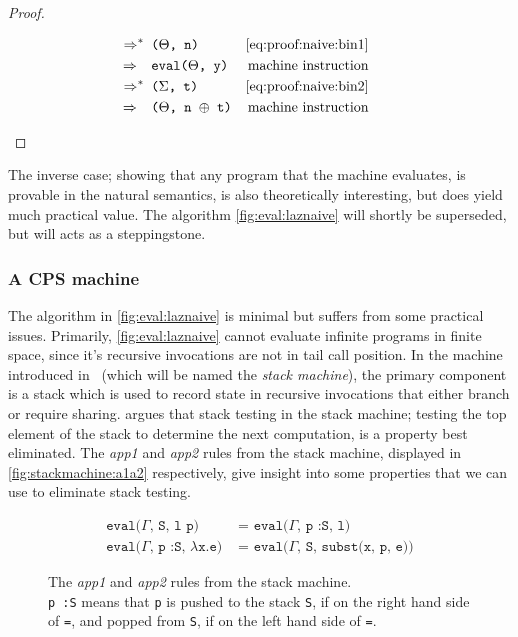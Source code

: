 \begin{proof}
\begin{pcases}
{\begin{align}
				\Rightarrow^*               & \texttt{ ($\Theta$, n)}                & \text{\autoref{eq:proof:naive:bin1}}\tag*{}  \\
				\Rightarrow\hspace*{0.18cm} & \texttt{ eval($\Theta$, y)}            & \text{machine instruction}\tag*{}            \\
				\Rightarrow^*               & \texttt{ ($\Sigma$, t)}                & \text{\autoref{eq:proof:naive:bin2}}\tag*{}  \\
				\Rightarrow\hspace*{0.18cm} & \texttt{ ($\Theta$, n $\oplus$ t)}     & \text{machine instruction}\tag*{}
			\end{align}
		}
	\end{pcases}
\end{proof}
The inverse case; showing that any program that the machine evaluates, is provable in the natural semantics, is also theoretically interesting, but does yield much practical value.
The algorithm \autoref{fig:eval:laznaive} will shortly be superseded, but will acts as a steppingstone.

\subsubsection{A CPS machine}
The algorithm in \autoref{fig:eval:laznaive} is minimal but suffers from some practical issues.
Primarily, \autoref{fig:eval:laznaive} cannot evaluate infinite programs in finite space, since it's recursive invocations are not in tail call position.
In the machine introduced in~\cite{sestoft1997deriving} (which will be named the \textit{stack machine}), the primary component is a stack which is used to record state in recursive invocations that either branch or require sharing.
\cite{sestoft1997deriving} argues that stack testing in the stack machine; testing the top element of the stack to determine the next computation, is a property best eliminated.
The \textit{app1} and \textit{app2} rules from the stack machine, displayed in \autoref{fig:stackmachine:a1a2} respectively, give insight into some properties that we can use to eliminate stack testing.
\begin{figure}[p]
	\begin{mdframed}
		\begin{align}
			\texttt{eval($\Gamma$, S, l p) }             & \texttt{= eval($\Gamma$, p :S, l)}\tag*{}           \\
			\texttt{eval($\Gamma$, p :S, $\lambda$x.e) } & \texttt{= eval($\Gamma$, S, subst(x, p, e))}\tag*{}
		\end{align}
	\end{mdframed}
	\caption{The \textit{app1} and \textit{app2} rules from the stack machine.\\
		\texttt{p :S} means that \texttt{p} is pushed to the stack \texttt{S}, if on the right hand side of \texttt{=}, and popped from \texttt{S}, if on the left hand side of \texttt{=}.}
	\label{fig:stackmachine:a1a2}
\end{figure}

